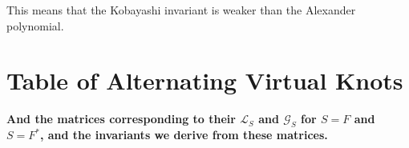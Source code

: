 \documentclass[12pt]{report}
\newcommand{\notered}[1]{{\color{Red} \textbf{#1}}}
\theoremstyle{upright}
\begin{document}
This means that the Kobayashi invariant is weaker than the Alexander polynomial.


\newpage
\printbibliography[title=References]


\appendix
{}
\titlespacing*{\chapter}{0pt}{40pt}{30pt}

\chapter{Table of Alternating Virtual Knots}

\notered{And the matrices corresponding to their $\mathcal{L}_{S}$ and $\mathcal{G}_{S}$ for $S = F$ and $S = F^{*}$, and the invariants we derive from these matrices.}
\end{document}
